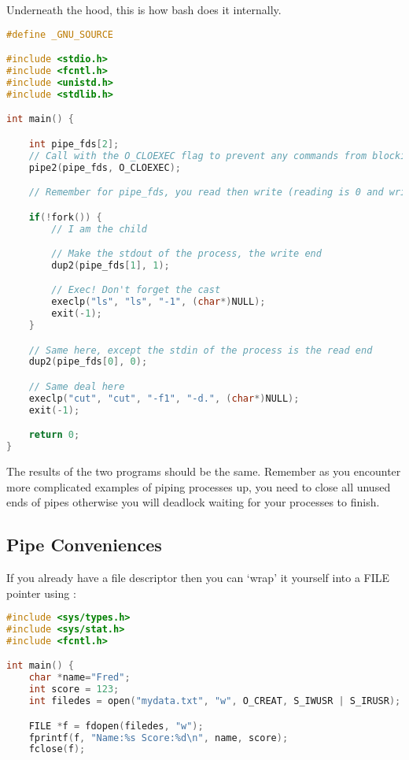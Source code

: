 Underneath the hood, this is how bash does it internally.


\begin{lstlisting}[language=C]
#define _GNU_SOURCE

#include <stdio.h>
#include <fcntl.h>
#include <unistd.h>
#include <stdlib.h>

int main() {

    int pipe_fds[2];
    // Call with the O_CLOEXEC flag to prevent any commands from blocking
    pipe2(pipe_fds, O_CLOEXEC);

    // Remember for pipe_fds, you read then write (reading is 0 and writing is 1)

    if(!fork()) {
        // I am the child

        // Make the stdout of the process, the write end
        dup2(pipe_fds[1], 1);

        // Exec! Don't forget the cast
        execlp("ls", "ls", "-1", (char*)NULL);
        exit(-1);
    }

    // Same here, except the stdin of the process is the read end
    dup2(pipe_fds[0], 0);

    // Same deal here
    execlp("cut", "cut", "-f1", "-d.", (char*)NULL);
    exit(-1);

    return 0;
}
\end{lstlisting}

The results of the two programs should be the same. Remember as you encounter more complicated examples of piping processes up, you need to close all unused ends of pipes otherwise you will deadlock waiting for your processes to finish.

\subsection{Pipe Conveniences}

If you already have a file descriptor then you can `wrap' it yourself into a FILE pointer using  :

\begin{lstlisting}[language=C]
#include <sys/types.h>
#include <sys/stat.h>
#include <fcntl.h>

int main() {
    char *name="Fred";
    int score = 123;
    int filedes = open("mydata.txt", "w", O_CREAT, S_IWUSR | S_IRUSR);

    FILE *f = fdopen(filedes, "w");
    fprintf(f, "Name:%s Score:%d\n", name, score);
    fclose(f);
\end{lstlisting}

